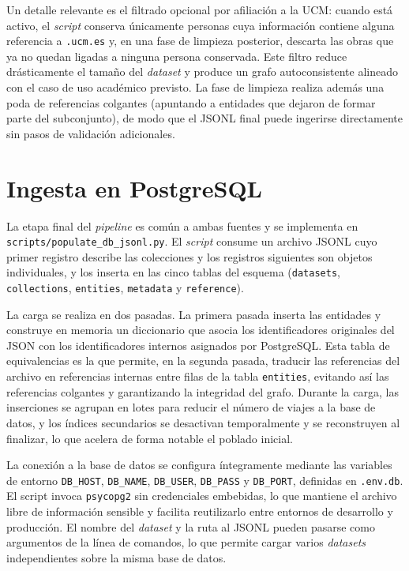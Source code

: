 Un detalle relevante es el filtrado opcional por afiliación a la UCM:
cuando está activo, el \textit{script} conserva únicamente personas cuya
información contiene alguna referencia a \texttt{.ucm.es} y, en una
fase de limpieza posterior, descarta las obras que ya no quedan ligadas
a ninguna persona conservada. Este filtro reduce drásticamente el
tamaño del \textit{dataset} y produce un grafo autoconsistente alineado con el
caso de uso académico previsto. La fase de limpieza realiza además una
poda de referencias colgantes (apuntando a entidades que dejaron de
formar parte del subconjunto), de modo que el JSONL final puede
ingerirse directamente sin pasos de validación adicionales.

\section{Ingesta en PostgreSQL}

La etapa final del \textit{pipeline} es común a ambas fuentes y se implementa en
\texttt{scripts/\allowbreak populate\_\allowbreak db\_\allowbreak jsonl.py}. El \textit{script} consume un archivo
JSONL cuyo primer registro describe las colecciones y los registros
siguientes son objetos individuales, y los inserta en las cinco tablas
del esquema (\texttt{datasets}, \texttt{collections}, \texttt{entities},
\texttt{metadata} y \texttt{reference}).

La carga se realiza en dos pasadas. La primera pasada inserta las
entidades y construye en memoria un diccionario que asocia los
identificadores originales del JSON con los identificadores internos
asignados por PostgreSQL. Esta tabla de equivalencias es la que permite,
en la segunda pasada, traducir las referencias del archivo en referencias
internas entre filas de la tabla \texttt{entities}, evitando así las
referencias colgantes y garantizando la integridad del grafo. Durante la
carga, las inserciones se agrupan en lotes para reducir el número de
viajes a la base de datos, y los índices secundarios se desactivan
temporalmente y se reconstruyen al finalizar, lo que acelera de forma
notable el poblado inicial.

La conexión a la base de datos se configura íntegramente mediante las
variables de entorno \texttt{DB\_HOST}, \texttt{DB\_NAME},
\texttt{DB\_USER}, \texttt{DB\_PASS} y \texttt{DB\_PORT}, definidas en
\texttt{.env.db}. El script invoca \texttt{psycopg2} sin credenciales
embebidas, lo que mantiene el archivo libre de información sensible y
facilita reutilizarlo entre entornos de desarrollo y producción. El
nombre del \textit{dataset} y la ruta al JSONL pueden pasarse como argumentos
de la línea de comandos, lo que permite cargar varios \textit{datasets}
independientes sobre la misma base de datos.

